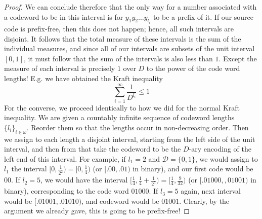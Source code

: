 \begin{theorem}
\begin{proof}
        We can conclude therefore that the only way for a number associated with a codeword to be in this interval is for $y_1y_2\ldots y_{l_i}$ to be a prefix of it. If our source code is prefix-free, then this does not happen; hence, all such intervals are disjoint. It follows that the total measure of these intervals is the sum of the individual measures, and since all of our intervals are subsets of the unit interval $[0,1]$, it must follow that the sum of the intervals is also less than $1$. Except the measure of each interval is precisely $1$ over $D$ to the power of the code word lengths! E.g. we have obtained the Kraft inequality
        \begin{equation}
            \sum_{i = 1}^{\infty} \frac{1}{D^{l_i}} \leq 1
        \end{equation}
        For the converse, we proceed identically to how we did for the normal Kraft inequality. We are given a countably infinite sequence of codeword lengths $\{l_i\}_{i \in \omega}$. Reorder them so that the lengths occur in non-decreasing order. Then we assign to each length a disjoint interval, starting from the left side of the unit interval, and then from that take the codeword to be the $D$-ary encoding of the left end of this interval. For example, if $l_1 = 2$ and $\mathcal{D} = \{0,1\}$, we would assign to $l_1$ the interval $[0,\frac{1}{2^2}) = [0,\frac{1}{4})$ (or $[.00,.01)$ in binary), and our first code would be $00$. If $l_2 = 5$, we would have the interval $[\frac{1}{4},\frac{1}{4}+\frac{1}{2^5}) = [\frac{1}{4},\frac{9}{32})$ (or $[.01000,,01001)$ in binary), corresponding to the code word $01000$. If $l_3 = 5$ again, next interval would be $[.01001,.01010)$, and codeword would be $01001$. Clearly, by the argument we already gave, this is going to be prefix-free!
    \end{proof}
\end{theorem}
